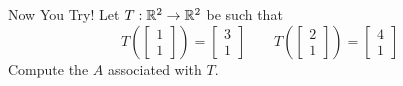 \documentclass[xcoler=dvipsnames, aspectratio=169]{beamer}
\begin{document}
\begin{frame}{Now You Try!}
    \scriptsize
    Let $T:\mathbb{R}^2\rightarrow\mathbb{R}^2$ be such that
    \[
        T\left(\begin{bmatrix}1\\1\end{bmatrix}\right) = \begin{bmatrix}3\\1\end{bmatrix}\qquad
        T\left(\begin{bmatrix}2\\1\end{bmatrix}\right) = \begin{bmatrix}4\\1\end{bmatrix}
    \]
    Compute the $A$ associated with $T$.
    \iftoggle{showSolutions}{
        \pause
        \[
            \aMat{cc|c}{
                1&2&b_1\\
                1&1&b_2
            }\pause\rightarrow\aMat{cc|c}{
                1&2&b_1\\
                0&-1&b_2-b_1
            }\pause\rightarrow\aMat{cc|c}{
                1&2&b_1\\
                0&1&b_1-b_2
            }\pause\rightarrow\aMat{cc|c}{
                1&0&2b_2-b_1\\
                0&1&b_1-b_2
            }
        \]
        So, 
        \[
            T(\vec{e}_1) = -T\left(\begin{bmatrix}1\\1\end{bmatrix}\right) 
            + T\left(\begin{bmatrix}2\\1\end{bmatrix}\right)\pause= \begin{bmatrix}1\\0\end{bmatrix},\qquad
            T(\vec{e}_2) = 2T\left(\begin{bmatrix}1\\1\end{bmatrix}\right) 
            - T\left(\begin{bmatrix}2\\1\end{bmatrix}\right)\pause= \begin{bmatrix}2\\1\end{bmatrix}
        \]
        \pause\ And:
        \[
            A = \begin{bmatrix}1&2\\0&1\end{bmatrix}
        \]
    }{
        \vspace{150pt}
    }
\end{frame}
\end{document}
